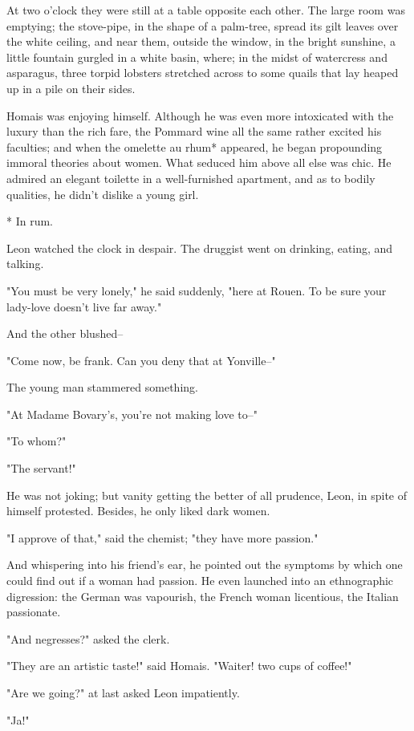 \documentclass{tufte-book}
\begin{document}
At two o'clock they were still at a table opposite each other. The large
room was emptying; the stove-pipe, in the shape of a palm-tree, spread
its gilt leaves over the white ceiling, and near them, outside the
window, in the bright sunshine, a little fountain gurgled in a white
basin, where; in the midst of watercress and asparagus, three torpid
lobsters stretched across to some quails that lay heaped up in a pile on
their sides.

Homais was enjoying himself. Although he was even more intoxicated with
the luxury than the rich fare, the Pommard wine all the same rather
excited his faculties; and when the omelette au rhum* appeared, he began
propounding immoral theories about women. What seduced him above all
else was chic. He admired an elegant toilette in a well-furnished
apartment, and as to bodily qualities, he didn't dislike a young girl.

     * In rum.


Leon watched the clock in despair. The druggist went on drinking,
eating, and talking.

"You must be very lonely," he said suddenly, "here at Rouen. To be sure
your lady-love doesn't live far away."

And the other blushed--

"Come now, be frank. Can you deny that at Yonville--"

The young man stammered something.

"At Madame Bovary's, you're not making love to--"

"To whom?"

"The servant!"

He was not joking; but vanity getting the better of all prudence, Leon,
in spite of himself protested. Besides, he only liked dark women.

"I approve of that," said the chemist; "they have more passion."

And whispering into his friend's ear, he pointed out the symptoms by
which one could find out if a woman had passion. He even launched into
an ethnographic digression: the German was vapourish, the French woman
licentious, the Italian passionate.

"And negresses?" asked the clerk.

"They are an artistic taste!" said Homais. "Waiter! two cups of coffee!"

"Are we going?" at last asked Leon impatiently.

"Ja!"
\end{document}

